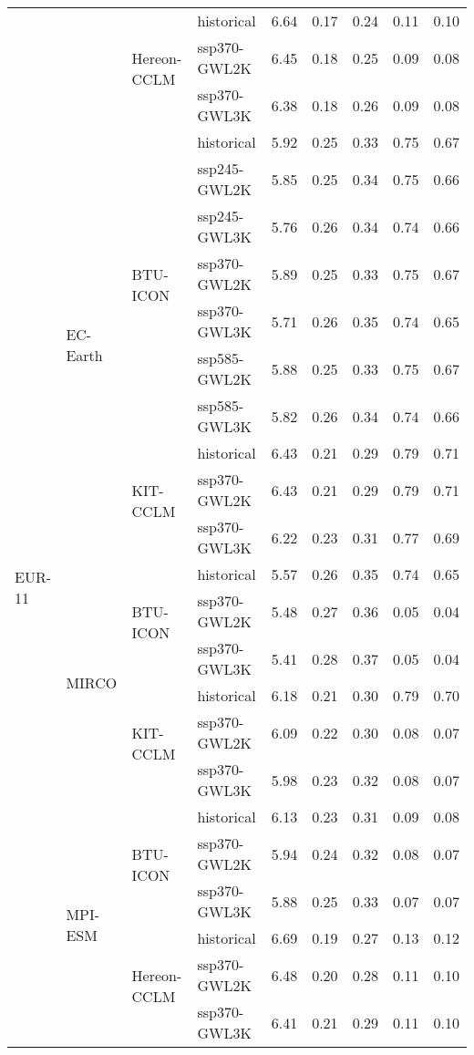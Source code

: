 \begin{table}[!htbp]
{\begin{tabular}{lll|l|c|c|c|c|c}
\cmidrule(lr){3-9}
 &  & \multirow{3}{*}{Hereon-CCLM} & historical & 6.64 & 0.17 & 0.24 & 0.11 & 0.10 \\
 &  &  & ssp370-GWL2K & 6.45 & 0.18 & 0.25 & 0.09 & 0.08 \\
 &  &  & ssp370-GWL3K & 6.38 & 0.18 & 0.26 & 0.09 & 0.08 \\
\midrule
\multirow{22}{*}{EUR-11} & \multirow{10}{*}{EC-Earth} & \multirow{7}{*}{BTU-ICON} & historical & 5.92 & 0.25 & 0.33 & 0.75 & 0.67 \\
 &  &  & ssp245-GWL2K & 5.85 & 0.25 & 0.34 & 0.75 & 0.66 \\
 &  &  & ssp245-GWL3K & 5.76 & 0.26 & 0.34 & 0.74 & 0.66 \\
 &  &  & ssp370-GWL2K & 5.89 & 0.25 & 0.33 & 0.75 & 0.67 \\
 &  &  & ssp370-GWL3K & 5.71 & 0.26 & 0.35 & 0.74 & 0.65 \\
 &  &  & ssp585-GWL2K & 5.88 & 0.25 & 0.33 & 0.75 & 0.67 \\
 &  &  & ssp585-GWL3K & 5.82 & 0.26 & 0.34 & 0.74 & 0.66 \\
\cmidrule(lr){3-9}
 &  & \multirow{3}{*}{KIT-CCLM} & historical & 6.43 & 0.21 & 0.29 & 0.79 & 0.71 \\
 &  &  & ssp370-GWL2K & 6.43 & 0.21 & 0.29 & 0.79 & 0.71 \\
 &  &  & ssp370-GWL3K & 6.22 & 0.23 & 0.31 & 0.77 & 0.69 \\
\cmidrule(lr){3-9}
\cmidrule(lr){2-9}
 & \multirow{6}{*}{MIRCO} & \multirow{3}{*}{BTU-ICON} & historical & 5.57 & 0.26 & 0.35 & 0.74 & 0.65 \\
 &  &  & ssp370-GWL2K & 5.48 & 0.27 & 0.36 & 0.05 & 0.04 \\
 &  &  & ssp370-GWL3K & 5.41 & 0.28 & 0.37 & 0.05 & 0.04 \\
\cmidrule(lr){3-9}
 &  & \multirow{3}{*}{KIT-CCLM} & historical & 6.18 & 0.21 & 0.30 & 0.79 & 0.70 \\
 &  &  & ssp370-GWL2K & 6.09 & 0.22 & 0.30 & 0.08 & 0.07 \\
 &  &  & ssp370-GWL3K & 5.98 & 0.23 & 0.32 & 0.08 & 0.07 \\
\cmidrule(lr){3-9}
\cmidrule(lr){2-9}
 & \multirow{6}{*}{MPI-ESM} & \multirow{3}{*}{BTU-ICON} & historical & 6.13 & 0.23 & 0.31 & 0.09 & 0.08 \\
 &  &  & ssp370-GWL2K & 5.94 & 0.24 & 0.32 & 0.08 & 0.07 \\
 &  &  & ssp370-GWL3K & 5.88 & 0.25 & 0.33 & 0.07 & 0.07 \\
\cmidrule(lr){3-9}
 &  & \multirow{3}{*}{Hereon-CCLM} & historical & 6.69 & 0.19 & 0.27 & 0.13 & 0.12 \\
 &  &  & ssp370-GWL2K & 6.48 & 0.20 & 0.28 & 0.11 & 0.10 \\
 &  &  & ssp370-GWL3K & 6.41 & 0.21 & 0.29 & 0.11 & 0.10 \\
\bottomrule
\end{tabular}
}
\end{table}
